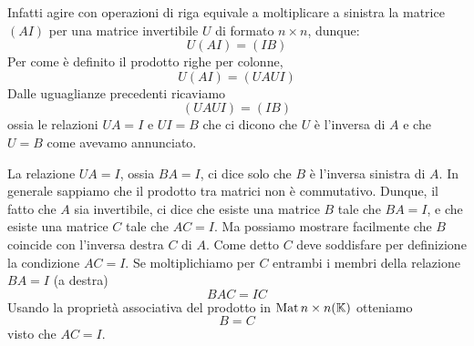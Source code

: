 Infatti agire con operazioni di riga equivale a moltiplicare a sinistra la matrice
$(A I)$ per una matrice invertibile $U$ di formato $n \times n$, dunque:
\[
	U (A I) = (I B)
\]
Per come è definito il prodotto righe per colonne,
\[
	U (A I) = (U A U I)
\]
Dalle uguaglianze precedenti ricaviamo
\[
	(U A U I) = (I B)
\]
ossia le relazioni $U A = I$ e $U I = B$ che ci dicono che $U$ è l'inversa di
$A$ e che $U = B$ come avevamo annunciato.

\begin{observation}
	La relazione $U A = I$, ossia $BA = I$, ci dice solo che $B$ è l'inversa
	sinistra di $A$. In generale sappiamo che il prodotto tra matrici non è
	commutativo. Dunque, il fatto che $A$ sia invertibile, ci dice che esiste una
	matrice $B$ tale che $BA = I$, e che esiste una matrice $C$ tale che $AC = I$.
	Ma possiamo mostrare facilmente che $B$ coincide con l'inversa destra $C$ di
	$A$. Come detto $C$ deve soddisfare per definizione la condizione $AC = I$.
	Se moltiplichiamo per $C$ entrambi i membri della relazione $BA = I$ (a destra)
	\[ BAC = IC \] Usando la proprietà associativa del prodotto in
	$\operatorname{Mat}{n \times n}(\mathbb{K})$ otteniamo \[B = C\] visto che $AC = I$.
\end{observation}

